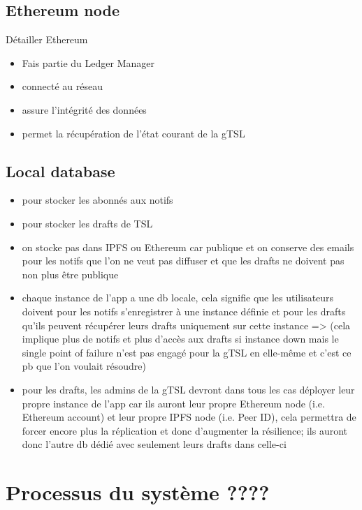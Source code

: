 \documentclass{tnreport}
\begin{document}
\subsection{Ethereum node}

Détailler Ethereum

\begin{itemize}
	\item Fais partie du Ledger Manager
	\item connecté au réseau
	\item assure l'intégrité des données
	\item permet la récupération de l'état courant de la gTSL
\end{itemize}

\subsection{Local database}

\begin{itemize}
	\item pour stocker les abonnés aux notifs
	\item pour stocker les drafts de TSL
	\item on stocke pas dans IPFS ou Ethereum car publique et on conserve des emails pour les notifs que l'on ne veut pas diffuser et que les drafts ne doivent pas non plus être publique
	\item chaque instance de l'app a une db locale, cela signifie que les utilisateurs doivent pour les notifs s'enregistrer à une instance définie et pour les drafts qu'ils peuvent récupérer leurs drafts uniquement sur cette instance => (cela implique plus de notifs et plus d'accès aux drafts si instance down mais le single point of failure n'est pas engagé pour la gTSL en elle-même et c'est ce pb que l'on voulait résoudre)
	\item pour les drafts, les admins de la gTSL devront dans tous les cas déployer leur propre instance de l'app car ils auront leur propre Ethereum node (i.e. Ethereum account) et leur propre IPFS node (i.e. Peer ID), cela permettra de forcer encore plus la réplication et donc d'augmenter la résilience; ils auront donc l'autre db dédié avec seulement leurs drafts dans celle-ci
\end{itemize}

\section{Processus du système ????}
\end{document}
